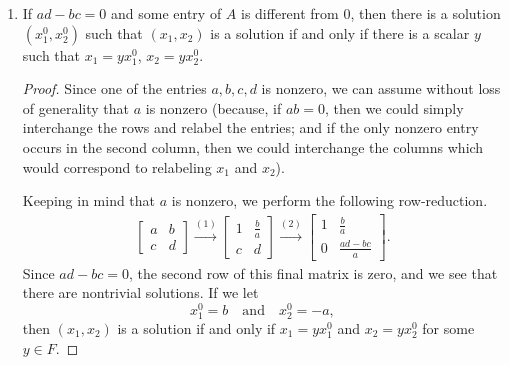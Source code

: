 \begin{enumerate}
\begin{proof}
    Next, suppose $b = 0$. Then $ad\neq0$ and we get
    \begin{gather*}
      \begin{bmatrix}
        a & 0 \\
        c & d
      \end{bmatrix}
      \xrightarrow{(1)}
      \begin{bmatrix}
        1 & 0 \\
        c & d
      \end{bmatrix}
      \xrightarrow{(2)}
      \begin{bmatrix}
        1 & 0 \\
        0 & d
      \end{bmatrix}
      \xrightarrow{(1)}
      \begin{bmatrix}
        1 & 0 \\
        0 & 1
      \end{bmatrix}.
    \end{gather*}
    So, in either case, $A$ is row-equivalent to the identity
    matrix. Therefore $AX = 0$ has only the trivial solution.
  \end{proof}
\item If $ad - bc = 0$ and some entry of $A$ is different from $0$,
  then there is a solution $(x_1^0, x_2^0)$ such that $(x_1,x_2)$ is a
  solution if and only if there is a scalar $y$ such that
  $x_1 = yx_1^0$, $x_2 = yx_2^0$.
  \begin{proof}
    Since one of the entries $a,b,c,d$ is nonzero, we can assume
    without loss of generality that $a$ is nonzero (because, if
    $ab = 0$, then we could simply interchange the rows and relabel
    the entries; and if the only nonzero entry occurs in the second
    column, then we could interchange the columns which would
    correspond to relabeling $x_1$ and $x_2$).

    Keeping in mind that $a$ is nonzero, we perform the following
    row-reduction.
    \begin{gather*}
      \begin{bmatrix}
        a & b \\
        c & d
      \end{bmatrix}
      \xrightarrow{(1)}
      \begin{bmatrix}
        1 & \frac{b}a \\[3pt]
        c & d
      \end{bmatrix}
      \xrightarrow{(2)}
      \begin{bmatrix}
        1 & \frac{b}a \\[3pt]
        0 & \frac{ad - bc}a
      \end{bmatrix}.
    \end{gather*}
    Since $ad - bc = 0$, the second row of this final matrix is zero,
    and we see that there are nontrivial solutions. If we let
    \begin{equation*}
      x_1^0 = b
      \quad\text{and}\quad
      x_2^0 = -a,
    \end{equation*}
    then $(x_1,x_2)$ is a solution if and only if $x_1 = yx_1^0$ and
    $x_2 = yx_2^0$ for some $y\in F$.
  \end{proof}
\end{enumerate}
